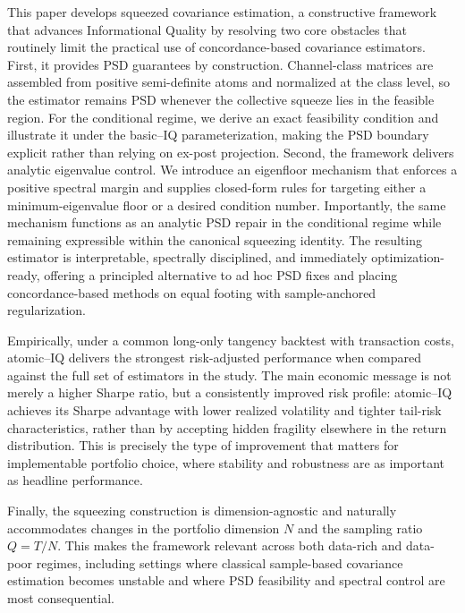\documentclass[12pt,letterpaper]{article}
\begin{document}
This paper develops squeezed covariance estimation, a constructive framework that advances Informational Quality by resolving two core obstacles that routinely limit the practical use of concordance-based covariance estimators. First, it provides PSD guarantees by construction. Channel-class matrices are assembled from positive semi-definite atoms and normalized at the class level, so the estimator remains PSD whenever the collective squeeze lies in the feasible region. For the conditional regime, we derive an exact feasibility condition and illustrate it under the basic--IQ parameterization, making the PSD boundary explicit rather than relying on ex-post projection. Second, the framework delivers analytic eigenvalue control. We introduce an eigenfloor mechanism that enforces a positive spectral margin and supplies closed-form rules for targeting either a minimum-eigenvalue floor or a desired condition number. Importantly, the same mechanism functions as an analytic PSD repair in the conditional regime while remaining expressible within the canonical squeezing identity. The resulting estimator is interpretable, spectrally disciplined, and immediately optimization-ready, offering a principled alternative to ad hoc PSD fixes and placing concordance-based methods on equal footing with sample-anchored regularization.

Empirically, under a common long-only tangency backtest with transaction costs, atomic--IQ delivers the strongest risk-adjusted performance when compared against the full set of estimators in the study. The main economic message is not merely a higher Sharpe ratio, but a consistently improved risk profile: atomic--IQ achieves its Sharpe advantage with lower realized volatility and tighter tail-risk characteristics, rather than by accepting hidden fragility elsewhere in the return distribution. This is precisely the type of improvement that matters for implementable portfolio choice, where stability and robustness are as important as headline performance.

Finally, the squeezing construction is dimension-agnostic and naturally accommodates changes in the portfolio dimension $N$ and the sampling ratio $Q=T/N$. This makes the framework relevant across both data-rich and data-poor regimes, including settings where classical sample-based covariance estimation becomes unstable and where PSD feasibility and spectral control are most consequential.


\end{document}
